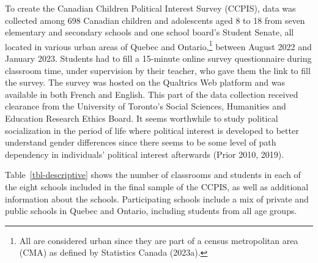 \documentclass[
  letterpaper,
  DIV=11,
  numbers=noendperiod]{scrreprt}
\begin{document}
To create the Canadian Children Political Interest Survey (CCPIS), data
was collected among 698 Canadian children and adolescents aged 8 to 18
from seven elementary and secondary schools and one school board's
Student Senate, all located in various urban areas of Quebec and
Ontario,\footnote{All are considered urban since they are part of a
  census metropolitan area (CMA) as defined by Statistics Canada
  (2023a).} between August 2022 and January 2023. Students had to fill a
15-minute online survey questionnaire during classroom time, under
supervision by their teacher, who gave them the link to fill the survey.
The survey was hosted on the Qualtrics Web platform and was available in
both French and English. This part of the data collection received
clearance from the University of Toronto's Social Sciences, Humanities
and Education Research Ethics Board. It seems worthwhile to study
political socialization in the period of life where political interest
is developed to better understand gender differences since there seems
to be some level of path dependency in individuals' political interest
afterwards (Prior 2010, 2019).

Table~\ref{tbl-descriptive} shows the number of classrooms and students
in each of the eight schools included in the final sample of the CCPIS,
as well as additional information about the schools. Participating
schools include a mix of private and public schools in Quebec and
Ontario, including students from all age groups.
\end{document}

